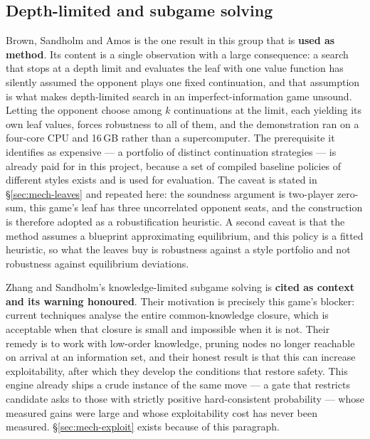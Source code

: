 \subsection{Depth-limited and subgame solving}
\label{app:rel-depthlimited}

Brown, Sandholm and Amos \cite{brown2018depthlimited} is the one result in this
group that is \textbf{used as method}. Its content is a single observation with
a large consequence: a search that stops at a depth limit and evaluates the leaf
with one value function has silently assumed the opponent plays one fixed
continuation, and that assumption is what makes depth-limited search in an
imperfect-information game unsound. Letting the opponent choose among $k$
continuations at the limit, each yielding its own leaf values, forces robustness
to all of them, and the demonstration ran on a four-core CPU and 16\,GB rather
than a supercomputer. The prerequisite it identifies as expensive --- a
portfolio of distinct continuation strategies --- is already paid for in this
project, because a set of compiled baseline policies of different styles exists
and is used for evaluation. The caveat is stated in \S\ref{sec:mech-leaves} and
repeated here: the soundness argument is two-player zero-sum, this game's leaf
has three uncorrelated opponent seats, and the construction is therefore adopted
as a robustification heuristic. A second caveat is that the method assumes a
blueprint approximating equilibrium, and this policy is a fitted heuristic, so
what the leaves buy is robustness against a style portfolio and not robustness
against equilibrium deviations.

Zhang and Sandholm's knowledge-limited subgame solving
\cite{zhang2021subgamesolvingwithoutck} is \textbf{cited as context and its
warning honoured}. Their motivation is precisely this game's blocker: current
techniques analyse the entire common-knowledge closure, which is acceptable when
that closure is small and impossible when it is not. Their remedy is to work
with low-order knowledge, pruning nodes no longer reachable on arrival at an
information set, and their honest result is that this can increase
exploitability, after which they develop the conditions that restore safety.
This engine already ships a crude instance of the same move --- a gate that
restricts candidate asks to those with strictly positive hard-consistent
probability --- whose measured gains were large and whose exploitability cost
has never been measured. \S\ref{sec:mech-exploit} exists because of this
paragraph.

